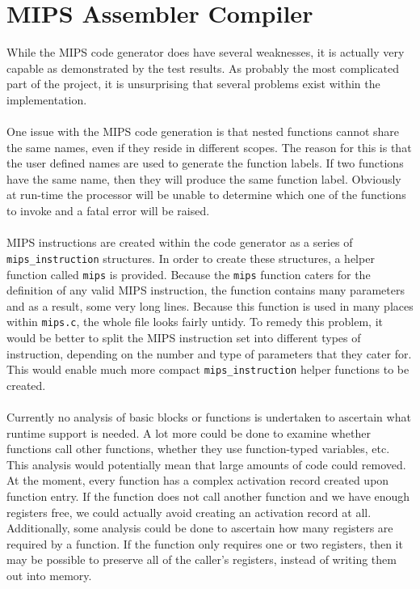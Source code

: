 \section{MIPS Assembler Compiler}
While the MIPS code generator does have several weaknesses, it is actually very capable as demonstrated by the test results. As probably the most complicated part of the project, it is unsurprising that several problems exist within the implementation.
\ \\ \ \\
One issue with the MIPS code generation is that nested functions cannot share the same names, even if they reside in different scopes. The reason for this is that the user defined names are used to generate the function labels. If two functions have the same name, then they will produce the same function label. Obviously at run-time the processor will be unable to determine which one of the functions to invoke and a fatal error will be raised.
\ \\ \ \\
MIPS instructions are created within the code generator as a series of \verb!mips_instruction! structures. In order to create these structures, a helper function called \verb!mips! is provided. Because the \verb!mips! function caters for the definition of any valid MIPS instruction, the function contains many parameters and as a result, some very long lines. Because this function is used in many places within \verb!mips.c!, the whole file looks fairly untidy. To remedy this problem, it would be better to split the MIPS instruction set into different types of instruction, depending on the number and type of parameters that they cater for. This would enable much more compact \verb!mips_instruction! helper functions to be created.
\ \\ \ \\
Currently no analysis of basic blocks or functions is undertaken to ascertain what runtime support is needed. A lot more could be done to examine whether functions call other functions, whether they use function-typed variables, etc. This analysis would potentially mean that large amounts of code could removed. At the moment, every function has a complex activation record created upon function entry. If the function does not call another function and we have enough registers free, we could actually avoid creating an activation record at all. Additionally, some analysis could be done to ascertain how many registers are required by a function. If the function only requires one or two registers, then it may be possible to preserve all of the caller's registers, instead of writing them out into memory.
